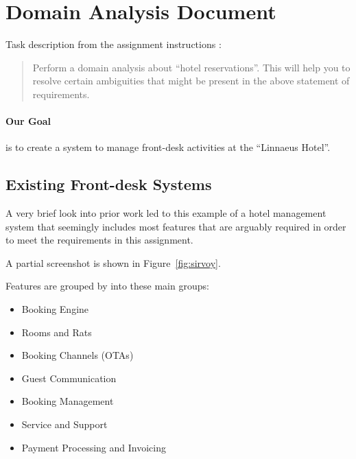%
%
%


\section{Domain Analysis Document}
Task description from the assignment instructions
\cite{2dv603:assignment1-instructions}:

\begin{quote}
  Perform a domain analysis about ``hotel reservations''. This will help you to
  resolve certain ambiguities that might be present in the above statement of
  requirements.
\end{quote}

\paragraph{Our Goal}
is to create a system to manage front-desk activities at the ``Linnaeus Hotel''.


\subsection{Existing Front-desk Systems}
A very brief look into prior work led to this \cite{2dv603:assignment1-sirvoy}
example of a hotel management system that seemingly includes most features that
are arguably required in order to meet the requirements in this assignment.

A partial screenshot is shown in Figure~\ref{fig:sirvoy}.

Features are grouped by into these main groups:

\begin{itemize}
  \item Booking Engine
  \item Rooms and Rats
  \item Booking Channels (OTAs)
  \item Guest Communication
  \item Booking Management
  \item Service and Support
  \item Payment Processing and Invoicing
\end{itemize}

